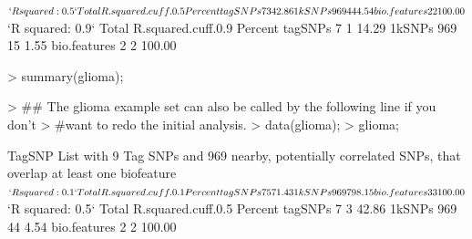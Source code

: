 \documentclass[a4paper]{article}
\begin{document}
\begin{Schunk}
\begin{Soutput}
$`R squared: 0.5`
             Total R.squared.cuff.0.5 Percent
tagSNPs          7                  3   42.86
1kSNPs         969                 44    4.54
bio.features     2                  2  100.00

$`R squared: 0.9`
             Total R.squared.cuff.0.9 Percent
tagSNPs          7                  1   14.29
1kSNPs         969                 15    1.55
bio.features     2                  2  100.00
\end{Soutput}
\begin{Sinput}
> summary(glioma);
\end{Sinput}
\begin{Sinput}
> ## The glioma example set can also be called by the following line if you don't 
> #want to redo the initial analysis. 
> data(glioma);
> glioma;
\end{Sinput}
\begin{Soutput}
TagSNP List with  9  Tag SNPs and 
 969 nearby,  potentially correlated SNPs, that overlap at least one biofeature 
$`R squared: 0.1`
             Total R.squared.cuff.0.1 Percent
tagSNPs          7                  5   71.43
1kSNPs         969                 79    8.15
bio.features     3                  3  100.00

$`R squared: 0.5`
             Total R.squared.cuff.0.5 Percent
tagSNPs          7                  3   42.86
1kSNPs         969                 44    4.54
bio.features     2                  2  100.00


\end{Soutput}
\end{Schunk}
\end{document}
